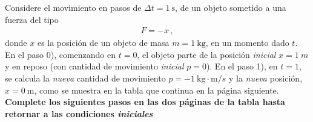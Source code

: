 \documentclass[12pt, a4paper]{article}
\begin{document}
\begin{exercise}[ID=tabla, tags={banco}]
Considere el movimiento en pasos de $\Delta t = \qty{1}{\s}$, de un objeto sometido a una fuerza del tipo
\begin{align}
    F = - x\,,
\end{align}
donde $x$ es la posición de un objeto de masa $m=\qty{1}{\kilo\g}$, en un momento dado $t$.  En el paso 0), comenzando en $t=0$, el objeto parte de la posición \emph{inicial} $x=\qty{1}{m}$ y en reposo (con cantidad de movimiento \emph{inicial} $p = 0$). En el paso 1), en $t=1$, se calcula la \emph{nueva} cantidad de movimiento $p= \qty{-1}{\kilo\g\cdot\m/s}$ y la \emph{nueva} posición, $x=\qty{0}{\m}$, como se muestra en la tabla que continua en la página siguiente. \textbf{Complete los siguientes pasos en las dos páginas de la tabla hasta retornar a las condiciones \emph{iniciales} }




\end{exercise}
\end{document}

